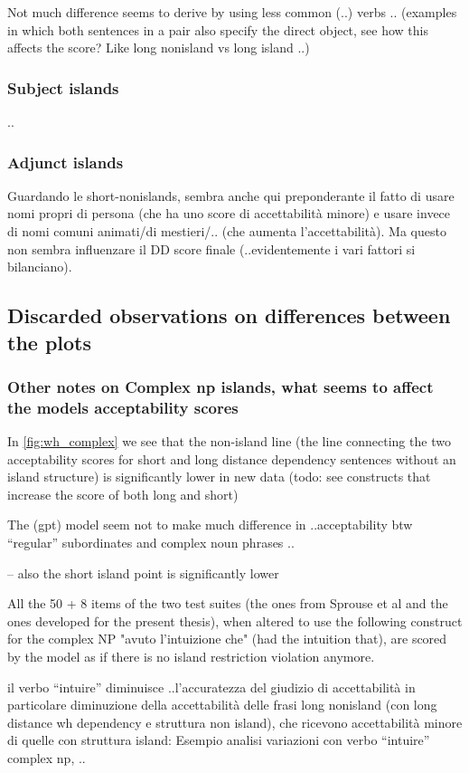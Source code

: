 Not much difference seems to derive by using less common (..) verbs .. 
(examples in which both sentences in a pair also specify the direct object, see how this affects the score? Like long nonisland vs long island ..)


\subsubsection{Subject islands}
..

\subsubsection{Adjunct islands}

Guardando le short-nonislands, sembra anche qui preponderante il fatto di usare nomi propri di persona (che ha uno score di accettabilità minore) e usare invece di nomi comuni animati/di mestieri/.. (che aumenta l’accettabilità). Ma questo non sembra influenzare il DD score finale (..evidentemente i vari fattori si bilanciano).


\subsection{Discarded observations on differences between the plots}

\subsubsection{Other notes on  Complex np islands,  what seems to affect the models acceptability scores}
In \autoref{fig:wh_complex} we see that the non-island line (the line connecting the two acceptability scores for short and long distance dependency sentences without an island structure) is significantly lower in new data (todo: see constructs that increase the score of both long and short)

The (gpt) model seem not to make much difference in ..acceptability btw “regular” subordinates and complex noun phrases ..

-- also the short island point is significantly lower

All the 50 + 8 items of the two test suites (the ones from Sprouse et al and the ones developed for the present thesis), when altered to use the following construct for the complex NP "avuto l'intuizione che" (had the intuition that), are scored by the model as if there is no island restriction violation anymore. 

il verbo “intuire” diminuisce ..l’accuratezza del giudizio di accettabilità
in particolare diminuzione della accettabilità delle frasi long nonisland (con long distance wh dependency e struttura non island), che ricevono accettabilità minore di quelle con struttura island:
Esempio analisi variazioni con verbo “intuire” complex np, ..

